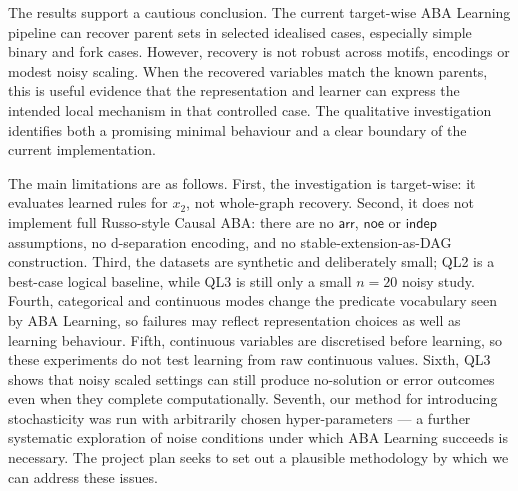 The results support a cautious conclusion. The current target-wise ABA Learning pipeline can recover parent sets in selected idealised cases, especially simple binary and fork cases. However, recovery is not robust across motifs, encodings or modest noisy scaling. When the recovered variables match the known parents, this is useful evidence that the representation and learner can express the intended local mechanism in that controlled case. The qualitative investigation identifies both a promising minimal behaviour and a clear boundary of the current implementation.

The main limitations are as follows. First, the investigation is target-wise: it evaluates learned rules for \(x_2\), not whole-graph recovery. Second, it does not implement full Russo-style Causal ABA: there are no \(\mathsf{arr}\), \(\mathsf{noe}\) or \(\mathsf{indep}\) assumptions, no d-separation encoding, and no stable-extension-as-DAG construction. Third, the datasets are synthetic and deliberately small; QL2 is a best-case logical baseline, while QL3 is still only a small \(n=20\) noisy study. Fourth, categorical and continuous modes change the predicate vocabulary seen by ABA Learning, so failures may reflect representation choices as well as learning behaviour. Fifth, continuous variables are discretised before learning, so these experiments do not test learning from raw continuous values. Sixth, QL3 shows that noisy scaled settings can still produce no-solution or error outcomes even when they complete computationally. Seventh, our method for introducing stochasticity was run with arbitrarily chosen hyper-parameters --- a further systematic exploration of noise conditions under which ABA Learning succeeds is necessary. The project plan seeks to set out a plausible methodology by which we can address these issues.